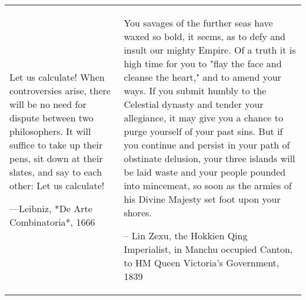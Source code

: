 \begin{table}[h]
    \centering
   
    
    \begin{tabular}{p{}p{}}
    
    \epigraph{Let us calculate! When controversies arise, there will be no need for dispute between two philosophers. It will suffice to take up their pens, sit down at their slates, and say to each other: Let us calculate!}{---Leibniz, *De Arte Combinatoria*, 1666} &
    
    \epigraph{You savages of the further seas have waxed so bold, it seems, as to defy and insult our mighty Empire. Of a truth it is high time for you to "flay the face and cleanse the heart," and to amend your ways. If you submit humbly to the Celestial dynasty and tender your allegiance, it may give you a chance to purge yourself of your past sins. But if you continue and persist in your path of obstinate delusion, your three islands will be laid waste and your people pounded into mincemeat, so soon as the armies of his Divine Majesty set foot upon your shores.}{-- Lin Zexu, the Hokkien Qing Imperialist, in Manchu occupied Canton, to HM Queen Victoria's Government, 1839} \\
    \end{tabular}
\end{table}
    
    